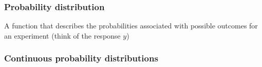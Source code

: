 \documentclass[dvipsnames]{beamer}
\begin{document}
\begin{frame}
 \frametitle{Probability distribution}
 A function that describes the probabilities associated with possible outcomes for an experiment (think of the response $y$)
\end{frame}

\begin{frame}
 \frametitle{Continuous probability distributions}
\end{frame}
\end{document}
